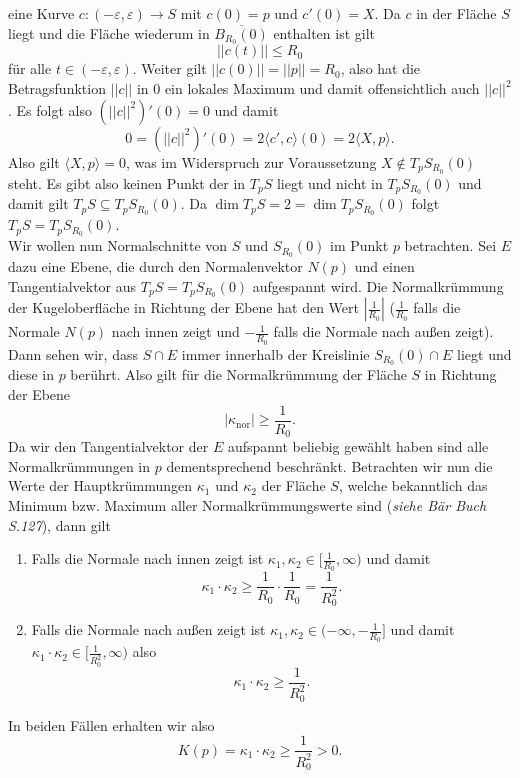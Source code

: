 \documentclass[11pt,titlepage]{article}
\newcommand{\abs}[1]{{\left| #1 \right|}}
\begin{document}
\begin{mdframed}[style=inner]
			eine Kurve $c:(-\varepsilon,\varepsilon)\to S$ mit 
			$c(0)=p$ und $c'(0)=X$. Da $c$ in der Fläche $S$ liegt und 
			die Fläche wiederum in $\overline{B_{R_0}(0)}$ enthalten ist gilt 
			\[\abs{\abs{c(t)}}\leq R_0\]
			für alle $t\in(-\varepsilon,\varepsilon)$. Weiter gilt 
			$\abs{\abs{c(0)}}=\abs{\abs{p}}=R_0$, also hat die Betragsfunktion 
			$\abs{\abs{c}}$ in $0$ ein lokales Maximum und damit offensichtlich 
			auch $\abs{\abs{c}}^2$. Es folgt also $(\abs{\abs{c}}^2)'(0)=0$ und 
			damit
			\[0=(\abs{\abs{c}}^2)'(0)=2\langle c',c\rangle (0)=2\langle X,p\rangle.\]
			Also gilt $\langle X,p\rangle =0$, was im Widerspruch zur 
			Voraussetzung $X\notin T_p S_{R_0}(0)$ steht. Es gibt also 
			keinen Punkt der in $T_p S$ liegt und nicht in $T_p S_{R_0}(0)$ und 
			damit gilt $T_p S\subseteq T_p S_{R_0}(0)$. Da 
			$\dim T_p S=2=\dim T_p S_{R_0}(0)$ folgt $T_p S=T_p S_{R_0}(0)$.\\
			Wir wollen nun Normalschnitte von $S$ und $S_{R_0}(0)$ im 
			Punkt $p$ betrachten. Sei $E$ dazu eine Ebene, die durch 
			den Normalenvektor $N(p)$ und einen Tangentialvektor 
			aus $T_p S=T_p S_{R_0}(0)$ aufgespannt wird. Die Normalkrümmung der 
			Kugeloberfläche in Richtung der Ebene hat den Wert 
			$\abs{\frac{1}{R_0}}$ ($\frac{1}{R_0}$ falls die Normale $N(p)$ 
			nach innen zeigt und $-\frac{1}{R_0}$ falls die 
			Normale nach außen zeigt). Dann sehen wir, 
			dass $S\cap E$ immer innerhalb der Kreislinie $S_{R_0}(0)\cap E$ 
			liegt und diese in $p$ berührt. Also gilt für die Normalkrümmung 
			der Fläche $S$ in Richtung der Ebene
			\[\abs{\kappa_{\text{nor}}}\geq \frac{1}{R_0}.\]
			Da wir den Tangentialvektor der $E$ aufspannt 
			beliebig gewählt haben sind alle Normalkrümmungen in $p$ 
			dementsprechend beschränkt. Betrachten wir nun die Werte der 
			Hauptkrümmungen $\kappa_1$ und $\kappa_2$ der Fläche $S$, 
			welche bekanntlich das Minimum bzw. Maximum aller 
			Normalkrümmungswerte sind (\textsl{siehe Bär Buch S.127}), dann 
			gilt
			\begin{enumerate}
				\item Falls die Normale nach innen zeigt ist 
				$\kappa_1,\kappa_2\in[\frac{1}{R_0},\infty)$ und damit
				\[\kappa_1\cdot\kappa_2\geq\frac{1}{R_0}\cdot\frac{1}{R_0}=\frac{1}{R_0^2}.\]
				\item Falls die Normale nach außen zeigt ist 
				$\kappa_1,\kappa_2\in(-\infty,-\frac{1}{R_0}]$ und damit
				$\kappa_1\cdot\kappa_2\in[\frac{1}{R_0^2},\infty)$ also
				\[\kappa_1\cdot\kappa_2\geq \frac{1}{R_0^2}.\]
			\end{enumerate}
			In beiden Fällen erhalten wir also
			\[K(p)=\kappa_1\cdot\kappa_2\geq \frac{1}{R_0^2}>0.\]
	\end{mdframed}
\end{document}
